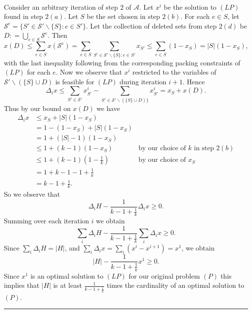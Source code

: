 \documentclass[letterpaper,12pt,oneside,onecolumn]{article}
\newcommand{\cA}{\mathcal{A}} \newcommand{\cB}{\mathcal{B}}
\newcommand{\cS}{\mathcal{S}} \newcommand{\cT}{\mathcal{T}}
\newenvironment{proof}{{\bf Proof:  }}{\hfill\rule{2mm}{2mm}}
\begin{document}
\begin{proof}
\paragraph{}
Consider an arbitrary iteration of step $2$ of $\cA$. Let $x^i$ be the solution to $(LP)$ found in step $2(a)$. Let $S$ be the set chosen in step $2(b)$. For each $e \in S$, let $\cS^e = \{S' \in \cS'\backslash\{S\} : e \in S'\}$. Let the collection of deleted sets from step $2(d)$ be $D: = \bigcup_{e\in S} \cS^e$. Then
$$x(D) \leq \sum_{e \in S} x(\cS^{e}) = \sum_{e\in S} \sum_{S' \in \cS'\backslash\{S\} : e\in S'} x_{S'} \leq \sum_{e \in S} (1 - x_S) = |S|(1-x_S),$$
with the last inequality following from the corresponding packing constraints of $(LP)$ for each $e$. Now we observe that $x^{i}$ restricted to the variables of $\cS' \backslash (\{S\} \cup D)$ is feasible for $(LP)$ during iteration $i+1$. Hence $$\Delta_i x \leq \sum_{S'\in \cS'} x^i_{S'} - \sum_{S' \in \cS'\backslash (\{S\} \cup D)\}} x^i_{S'} = x_S + x(D).$$
Thus by our bound on $x(D)$ we have
\begin{align*}
\Delta_i x &\leq x_S + |S|(1-x_S) \\
&= 1 - (1-x_S) + |S|(1-x_S) \\
&= 1 + (|S| -1)(1-x_S) \\
&\leq 1+(k - 1)(1-x_S) &\text{by our choice of $k$ in step $2(b)$} \\
&\leq 1 + (k-1)(1-\frac{1}{k}) &\text{by our choice of $x_S$} \\
&= 1 + k - 1 - 1 + \frac{1}{k} \\
&= k-1 + \frac{1}{k}.
\end{align*}
So we observe that $$\Delta_i H - \frac{1}{k-1+\frac{1}{k}}\Delta_i x \geq 0.$$
Summing over each iteration $i$ we obtain
$$\sum_i \Delta_i H - \frac{1}{k-1+\frac{1}{k}} \sum_i \Delta_i x \geq 0.$$
Since $\sum_i \Delta_i H = |H|$, and $\sum_i \Delta_i x = \sum_i (x^i - x^{i+1}) = x^1$, we obtain
$$|H| - \frac{1}{k-1+\frac{1}{k}}x^1 \geq 0.$$
Since $x^1$ is an optimal solution to $(LP)$ for our original problem $(P)$ this implies that $|H|$ is at least $\frac{1}{k-1+\frac{1}{k}}$ times the cardinality of an optimal solution to $(P)$.
\end{proof}
\end{document}
